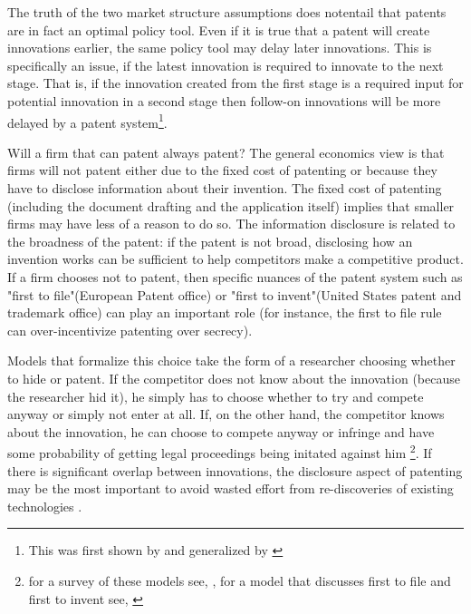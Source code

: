 The truth of the two market structure assumptions does notentail that patents are in fact an optimal policy tool. Even if it is true that a patent will create innovations earlier, the same policy tool may delay later innovations. This is specifically an issue, if the latest innovation is required to innovate to the next stage. That is, if the innovation created from the first stage is a required input for potential innovation in a second stage then follow-on innovations will be more delayed by a patent system\footnote{This was first shown by \cite{bessen_maskin} and generalized by \cite{Bryan2017}}.

Will a firm that can patent always patent? The general economics view is that firms will not patent either due to the fixed cost of patenting or because they have to disclose information about their invention. The fixed cost of patenting (including the document drafting and the application itself) implies that smaller firms may have less of a reason to do so. The information disclosure is related to the broadness of the patent: if the patent is not broad, disclosing how an invention works can be sufficient to help competitors make a competitive product. If a firm chooses not to patent, then specific nuances of the patent system such as "first to file"(European Patent office) or "first to invent"(United States patent and trademark office) can play an important role (for instance, the first to file rule can over-incentivize patenting over secrecy).

Models that formalize this choice take the form of a researcher choosing whether to hide or patent. If the competitor does not know about the innovation (because the researcher hid it), he simply has to choose whether to try and compete anyway or simply not enter at all. If, on the other hand, the competitor knows about the innovation, he can choose to compete anyway or infringe and have some probability of getting legal proceedings being initated against him \footnote{for a survey of these models see, \cite{Hall2014}, for a model that discusses first to file and first to invent see, \cite{Scotchmer1990} }. If there is significant overlap between innovations, the disclosure aspect of patenting may be the most important to avoid wasted effort from re-discoveries of existing technologies \citep{Kultti2007}.  



